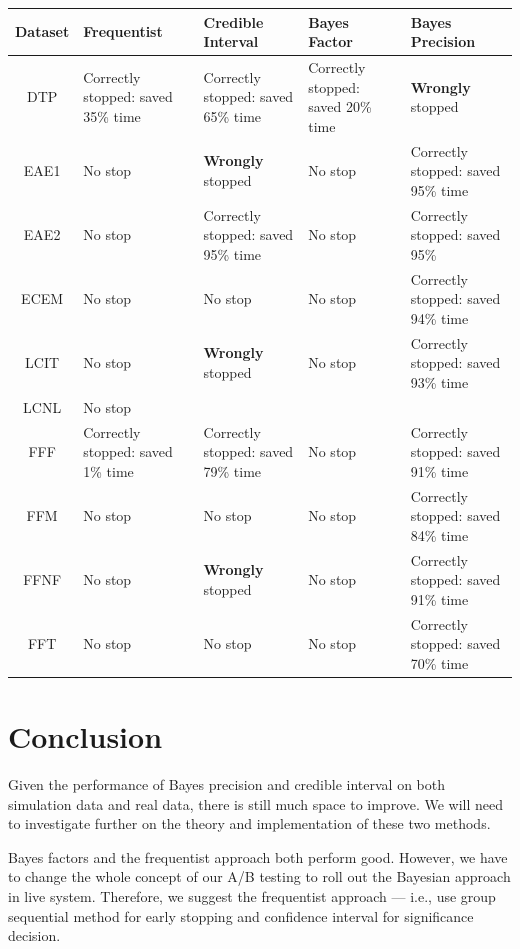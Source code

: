 \documentclass[paper=a4, fontsize=11pt]{scrartcl} %
\numberwithin{equation}{section} %
\numberwithin{figure}{section} %
\numberwithin{table}{section} %
\begin{document}
\begin{center}
  \begin{tabular}{ | c | p{30mm} | p{30mm} | p{30mm} | p{30mm} |}
    \hline
     Dataset & Frequentist  & Credible Interval & Bayes Factor & Bayes Precision \\ \hline\hline
     DTP & Correctly stopped: saved 35\% time & Correctly stopped: saved 65\% time & Correctly stopped: saved 20\% time & \textbf{Wrongly} stopped \\ \hline
     EAE1 & No stop & \textbf{Wrongly} stopped & No stop & Correctly stopped: saved 95\% time \\ \hline
     EAE2 & No stop & Correctly stopped: saved 95\% time & No stop & Correctly stopped: saved 95\% \\ \hline
     ECEM & No stop & No stop & No stop & Correctly stopped: saved 94\% time \\ \hline
     LCIT & No stop & \textbf{Wrongly} stopped & No stop & Correctly stopped: saved 93\% time\\ \hline
     LCNL & No stop & & & \\ \hline
     FFF & Correctly stopped: saved 1\% time & Correctly stopped: saved 79\% time & No stop & Correctly stopped: saved 91\% time \\ \hline
     FFM & No stop & No stop & No stop & Correctly stopped: saved 84\% time \\ \hline
     FFNF & No stop & \textbf{Wrongly} stopped & No stop & Correctly stopped: saved 91\% time\\ \hline
     FFT & No stop & No stop & No stop & Correctly stopped: saved 70\% time \\ \hline
  \end{tabular}
\label{table:final}
\end{center}


\section{Conclusion}
Given the performance of Bayes precision and credible interval on both simulation data and real data, there is still much space to improve. We will need to investigate further on the theory and implementation of these two methods.

Bayes factors and the frequentist approach both perform good. However, we have to change the whole concept of our A/B testing to roll out the Bayesian approach in live system. Therefore, we suggest the frequentist approach --- i.e., use group sequential method for early stopping and confidence interval for significance decision.

\end{document}
